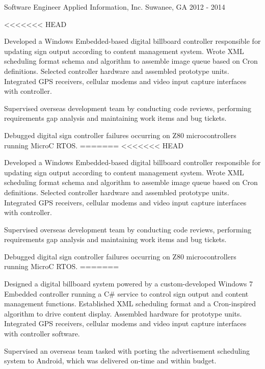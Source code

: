 \begin{cventries}
  \cventry
    {Software Engineer} %
    {Applied Information, Inc.} %
    {Suwanee, GA} %
    {2012 - 2014} %
    {
      \begin{cvitems} %
<<<<<<< HEAD
        \item {Developed a Windows Embedded-based digital billboard controller responsible for updating sign output according to content management system. Wrote XML scheduling format schema and algorithm to assemble image queue based on Cron definitions. Selected controller hardware and assembled prototype units. Integrated GPS receivers, cellular modems and video input capture interfaces with controller.}
		\item {Supervised overseas development team by conducting code reviews, performing requirements gap analysis and maintaining work items and bug tickets.}
		\item {Debugged digital sign controller failures occurring on Z80 microcontrollers running MicroC RTOS.}
=======
<<<<<<< HEAD
        \item {Developed a Windows Embedded-based digital billboard controller responsible for updating sign output according to content management system. Wrote XML scheduling format schema and algorithm to assemble image queue based on Cron definitions. Selected controller hardware and assembled prototype units. Integrated GPS receivers, cellular modems and video input capture interfaces with controller.}
		\item {Supervised overseas development team by conducting code reviews, performing requirements gap analysis and maintaining work items and bug tickets.}
		\item {Debugged digital sign controller failures occurring on Z80 microcontrollers running MicroC RTOS.}
=======
        \item {Designed a digital billboard system powered by a custom-developed Windows 7 Embedded controller running a C# service to control sign output and content management functions. Established XML scheduling format and a Cron-inspired algorithm to drive content display. Assembled hardware for prototype units. Integrated GPS receivers, cellular modems and video input capture interfaces with controller software.}
		\item {Supervised an overseas team tasked with porting the advertisement scheduling system to Android, which was delivered on-time and within budget.}

\end{cvitems}}
\end{cventries}
